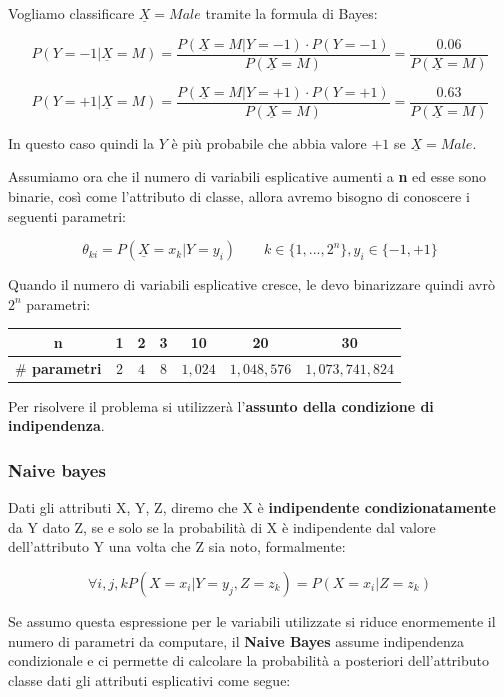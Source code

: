 Vogliamo classificare $\underline{X} = Male$ tramite la formula di Bayes:

\[P(Y = -1 | \underline{X} = M) = \frac{P(\underline{X} = M | Y=-1) \cdot P(Y=-1)}{P(\underline{X}= M)} = \frac{0.06}{P(\underline{X} = M)}\]

\[P(Y = +1 | \underline{X} = M) = \frac{P(\underline{X} = M | Y=+1) \cdot P(Y=+1)}{P(\underline{X}= M)} = \frac{0.63}{P(\underline{X} = M)}\]

In questo caso quindi la $Y$ è più probabile che abbia valore $+1$ se $\underline{X} = Male$.

Assumiamo ora che il numero di variabili esplicative aumenti a \textbf{n} ed esse sono binarie, così come l'attributo di classe, allora avremo bisogno di conoscere i seguenti parametri:

\[\theta_{ki} = P(\underline{X} = x_k | Y = y_i) \qquad k \in \{1, ..., 2^n\}, y_i \in \{-1,+1\}\]

Quando il numero di variabili esplicative cresce, le devo binarizzare quindi avrò $2^n$ parametri:

\begin{table}[H]
	\centering
	\begin{tabular}{|c|c|c|c|c|c|c|}
		\hline
		\textbf{n} & 1 & 2 & 3 & 10 & 20 & 30 \\
		\hline
		\textbf{$\#$ parametri}& $2$ & $4$ & $8$ & $1,024$ & $1,048,576$ & $1,073,741,824$  \\
		\hline
	\end{tabular}
\end{table}

Per risolvere il problema si utilizzerà l'\textbf{assunto della condizione di indipendenza}.

\subsubsection{Naive bayes}

\begin{defn}
Dati gli attributi X, Y, Z, diremo che X \`e \textbf{indipendente condizionatamente} da Y dato Z, se e solo se la probabilit\`a di X è indipendente dal valore dell'attributo Y una volta che Z sia noto, formalmente: 

\[\forall i,j,k P(X=x_i|Y=y_j, Z=z_k) = P(X=x_i|Z=z_k)\]
\end{defn}

Se assumo questa espressione per le variabili utilizzate si riduce enormemente il numero di parametri da computare, il \textbf{Naive Bayes} assume indipendenza condizionale e ci permette di calcolare la probabilità a posteriori dell'attributo classe dati gli attributi esplicativi come segue: 

